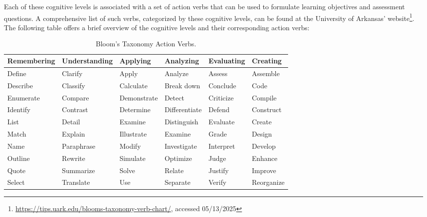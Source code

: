 Each of these cognitive levels is associated with a set of action verbs that can be used to formulate learning objectives and assessment questions. A comprehensive list of such verbs, categorized by these cognitive levels, can be found at the University of Arkansas' website\footnote{\url{https://tips.uark.edu/blooms-taxonomy-verb-chart/}, accessed 05/13/2025}. The following table offers a brief overview of the cognitive levels and their corresponding action verbs:


\begin{table}[htbp]
   \centering
   \renewcommand{\arraystretch}{1.6} %
   \caption{Bloom's Taxonomy Action Verbs.}
   \label{tab:blooms_verbs_columns}
   \begin{tabularx}{\textwidth}{|>{\hsize=1.15\hsize\centering\arraybackslash}X|>{\hsize=1.25\hsize\centering\arraybackslash}X|>{\hsize=0.95\hsize\centering\arraybackslash}X|>{\hsize=0.95\hsize\centering\arraybackslash}X|>{\hsize=0.9\hsize\centering\arraybackslash}X|>{\hsize=0.8\hsize\centering\arraybackslash}X|}
     \hline
     \rowcolor{gray!15}
     \textbf{Remembering} & \textbf{Understanding} & \textbf{Applying} & \textbf{Analyzing} & \textbf{Evaluating} & \textbf{Creating} \\
     \hline
     Define & Clarify & Apply & Analyze & Assess & Assemble \\
     \hline
     Describe & Classify & Calculate & Break down & Conclude & Code \\
     \hline
     Enumerate & Compare & Demonstrate & Detect & Criticize & Compile \\
     \hline
     Identify & Contrast & Determine & Differentiate & Defend & Construct \\
     \hline
     List & Detail & Examine & Distinguish & Evaluate & Create \\
     \hline
     Match & Explain & Illustrate & Examine & Grade & Design \\
     \hline
     Name & Paraphrase & Modify & Investigate & Interpret & Develop \\
     \hline
     Outline & Rewrite & Simulate & Optimize & Judge & Enhance \\
     \hline
     Quote & Summarize & Solve & Relate & Justify & Improve \\
     \hline
     Select & Translate & Use & Separate & Verify & Reorganize \\
     \hline
   \end{tabularx}
 \end{table}

